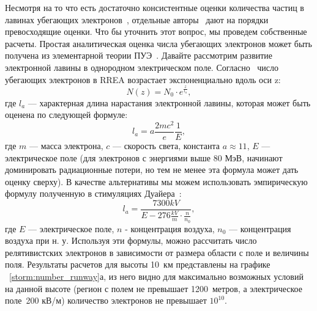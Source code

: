 Несмотря на то что есть достаточно консистентные оценки количества частиц в лавинах убегающих электронов~\cite{moss2006, DwyerSmith2005, skeltved2014, Gurevich2001ufn, Dwyer2012}, отдельные авторы~\cite{Oreshkin_2018} дают на порядки превосходящие оценки. Что бы уточнить этот вопрос, мы проведем собственные расчеты. Простая аналитическая оценка числа убегающих электронов может быть получена из элементарной теории ПУЭ~\cite{Gurevich2001ufn}. Давайте рассмотрим развитие электронной лавины в однородном электрическом поле. Согласно~\cite{Gurevich2001ufn} число убегающих электронов в RREA возрастает экспоненциально вдоль оси z:
\begin{equation}
\label{storm:exp}
N(z) = N_0 \cdot e^{\frac{z}{l_a}},
\end{equation}
где $l_a$ --- характерная длина нарастания электронной лавины, которая может быть оценена по следующей формуле:
\begin{equation}
l_a = a\frac{2 m c^{2}}{e} \frac{1}{E},
\end{equation}
где $m$ --- масса электрона, $c$ --- скорость света, константа $a \approx 11$, $E$ --- электрическое поле (для электронов с энергиями выше 80 МэВ, начинают доминировать радиационные потери, но тем не менее эта формула может дать оценку сверху). В качестве альтернативы мы можем использовать эмпирическую формулу полученную в стимуляциях Дуайера~\cite{Dwyer2007}:
\begin{equation}
\label{storm:dwyer}
l_a = \frac{7300 kV}{E - 276 \frac{kV}{m} \cdot \frac{n}{n_0}},
\end{equation}
где $E$ --- электрическое поле, $n$ - концентрация воздуха, $n_0$ --- концентрация воздуха при н. у. Используя эти формулы, можно рассчитать число релятивистских электронов в зависимости от размера области с поле и величины поля. Результаты расчетов для высоты 10~км представлены на графике ~\ref{storm:number_runway}а, из него видно для максимально возможных условий на данной высоте (регион с полем не превышает 1200~метров, а электрическое поле~200 кВ/м) количество электронов не превышает $10^{10}$.

